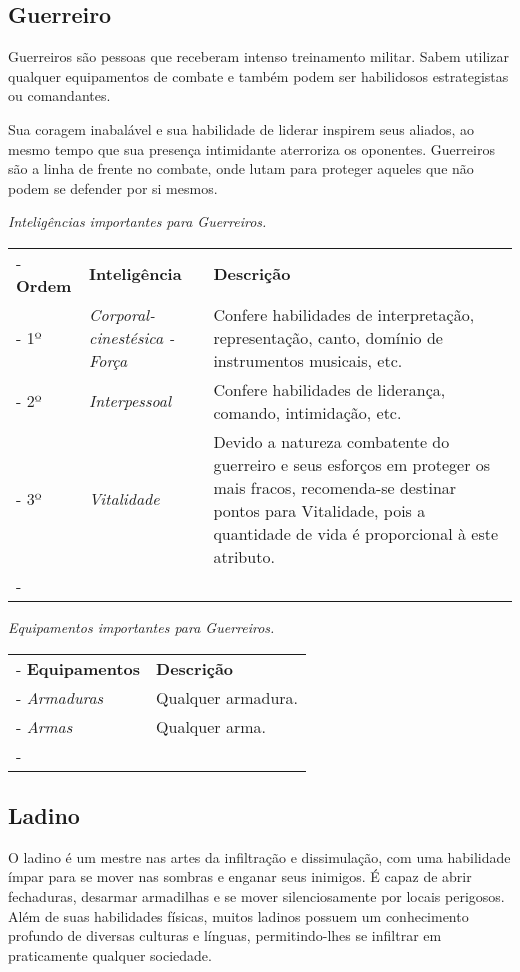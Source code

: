 \subsection*{Guerreiro}
Guerreiros são pessoas que receberam intenso treinamento militar. Sabem utilizar qualquer equipamentos de combate e também podem ser habilidosos estrategistas ou comandantes. 

Sua coragem inabalável e sua habilidade de liderar inspirem seus aliados, ao mesmo tempo que sua presença intimidante aterroriza os oponentes. Guerreiros são a linha de frente no combate, onde lutam para proteger aqueles que não podem se defender por si mesmos. 

\begin{table}[htb]
	\centering\smaller
	\emph{Inteligências importantes para Guerreiros.} \\
	\begin{tabu} to \textwidth {|X[c 0.5]|X[1]|X[3]|} \tabucline-
		\textbf{Ordem}	& \textbf{Inteligência}	&	\textbf{Descrição}	\\ \tabucline-
		1º		& \emph{Corporal-cinestésica - Força}  	& Confere habilidades de interpretação, representação, canto, domínio de instrumentos musicais, etc. 	\\ \tabucline-
		2º		& \emph{Interpessoal} & Confere habilidades de liderança, comando, intimidação, etc. \\ \tabucline-
		3º 		& \emph{Vitalidade} & Devido a natureza combatente do guerreiro e seus esforços em proteger os mais fracos, recomenda-se destinar pontos para Vitalidade, pois a quantidade de vida é proporcional à este atributo. \\ \tabucline-
	\end{tabu}
\end{table}

\begin{table}[htb]
	\centering\smaller
	\emph{Equipamentos importantes para Guerreiros.}
	\begin{tabu} to \textwidth {|X[0.5]|X[3]|} \tabucline-
		\textbf{Equipamentos}	&	\textbf{Descrição}	\\ \tabucline-
		\emph{Armaduras} & Qualquer armadura.	\\ \tabucline-
		\emph{Armas} & Qualquer arma. \\ \tabucline-
	\end{tabu}
\end{table}

\subsection*{Ladino}
O ladino é um mestre nas artes da infiltração e dissimulação, com uma habilidade ímpar para se mover nas sombras e enganar seus inimigos. É capaz de abrir fechaduras, desarmar armadilhas e se mover silenciosamente por locais perigosos. Além de suas habilidades físicas, muitos ladinos possuem um conhecimento profundo de diversas culturas e línguas, permitindo-lhes se infiltrar em praticamente qualquer sociedade. 

